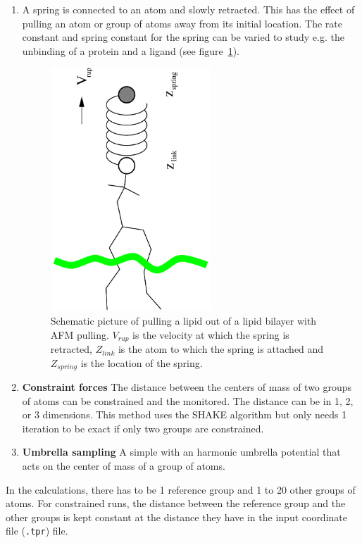 \begin{enumerate}
\item{\textbf{}} A spring is connected to an atom and
slowly retracted. This has the effect of pulling an atom or group of
atoms away from its initial location. The rate constant and spring
constant for the spring can be varied to study e.g. the unbinding of a
protein and a ligand (see figure~\ref{fi:pull}). 
\begin{figure}
\centerline{\includegraphics[width=6cm,angle=270]{plots/pull}}
\caption{Schematic picture of pulling a lipid out of a lipid bilayer
with AFM pulling. $V_{rup}$ is the velocity at which the spring is
retracted, $Z_{link}$ is the atom to which the spring is attached and
$Z_{spring}$ is the location of the spring.}
\label{fi:pull} 
\end{figure}
\item{\textbf{Constraint forces}} The distance between the centers of
mass of two groups of atoms can be constrained and the 
 monitored.
The distance can be in 1, 2, or 3 dimensions. This method
uses the SHAKE algorithm but only needs 1 iteration to be
exact if only two groups are constrained. 
\item{\textbf{Umbrella sampling}} A simple
 with an
harmonic umbrella potential that acts on the center of mass of a group
of atoms.
\end{enumerate}

In the calculations, there has to be 1 reference group and 1 to 20
other groups of atoms. For constrained runs, the distance between the
reference group and the other groups is kept constant at the distance
they have in the input coordinate file ({\tt .tpr}) file.

